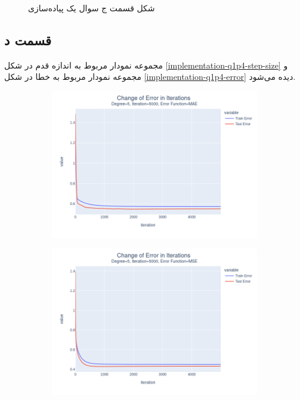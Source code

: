 \documentclass[14pt,a4]{article}
\begin{document}
\begin{figure}[h]
\begin{subfigure}{0.3\linewidth}
    \end{subfigure}
    \caption{شکل قسمت ج سوال یک پیاده‌سازی}
    \label{implementation-q1p3}
\end{figure}

\newpage

\subsection*{قسمت د}

مجموعه نمودار مربوط به اندازه قدم در شکل \ref{implementation-q1p4-step-size} و مجموعه نمودار
مربوط به خطا در شکل \ref{implementation-q1p4-error} دیده می‌شود.

\begin{figure}[h]
    \centering
    \begin{subfigure}{0.3\linewidth}
        \centering
        \includegraphics[width=\textwidth]{images/implementation/q1/part_d/error/5_5000_MAE.png}
    \end{subfigure}
    \hfill
    \begin{subfigure}{0.3\textwidth}
        \centering
        \includegraphics[width=\textwidth]{images/implementation/q1/part_d/error/5_5000_MSE.png}

\end{subfigure}
\end{figure}
\end{document}
